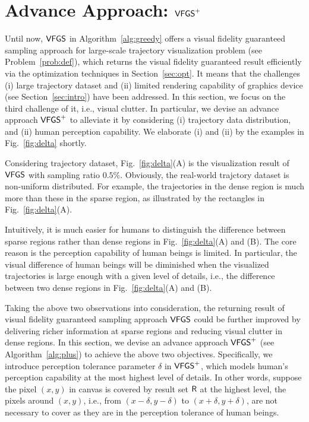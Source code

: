 \section{Advance Approach: $\mathsf{VFGS}^{+}$}\label{sec:aa}
Until now, $\mathsf{VFGS}$ in Algorithm~\ref{alg:greedy} offers a visual fidelity guaranteed sampling approach for large-scale trajectory visualization problem (see Problem~\ref{prob:def}),
which returns the visual fidelity guaranteed result efficiently via the optimization techniques in Section~\ref{sec:opt}.
It means that the challenges (i) large trajectory dataset and (ii) limited rendering capability of graphics device (see Section~\ref{sec:intro}) have been addressed.
In this section, we focus on the third challenge of it, i.e.,  visual clutter.
In particular, we devise an advance approach $\mathsf{VFGS}^{+}$ to alleviate it by considering
(i) trajectory data distribution, and (ii) human perception capability.
We elaborate (i) and (ii) by the examples in Fig.~\ref{fig:delta} shortly.

 Considering \pt{} trajectory dataset, Fig.~\ref{fig:delta}(A) is the visualization result of $\mathsf{VFGS}$ with sampling ratio $0.5\%$.
Obviously, the real-world trajctory dataset is non-uniform distributed.
For example, the trajectories in the dense region is much more than these in the sparse region, as illustrated by the rectangles in Fig.~\ref{fig:delta}(A).

 Intuitively, it is much easier for humans to distinguish the difference between sparse regions rather than dense regions in Fig.~\ref{fig:delta}(A) and (B).
The core reason is the perception capability of human beings is limited.
In particular, the visual difference of human beings will be diminished when the visualized trajectories is large enough with a given level of details,
i.e., the difference between two dense regions in Fig.~\ref{fig:delta}(A) and (B).

Taking the above two observations into consideration, the returning result of visual fidelity guaranteed sampling approach $\mathsf{VFGS}$ could be further improved by
delivering richer information at sparse regions and reducing visual clutter in dense regions.
In this section, we devise an advance approach $\mathsf{VFGS}^{+}$ (see Algorithm~\ref{alg:plus}) to achieve the above two objectives.
Specifically, we introduce perception tolerance parameter $\delta$ in $\mathsf{VFGS}^{+}$, which models human's perception capability at the most highest level of details.
In other words, suppose the pixel $(x,y)$ in canvas is covered by result set $\mathsf{R}$ at the highest level,
the pixels around $(x,y)$, i.e., from $(x-\delta, y-\delta)$ to $(x+\delta, y+\delta)$, are not necessary to cover as they are in the perception tolerance of human beings.


